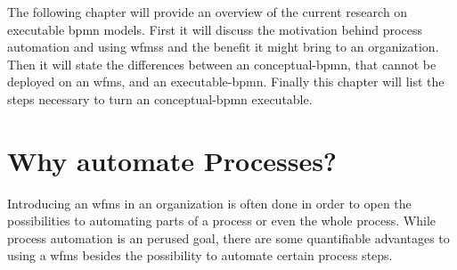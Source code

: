 
The following chapter will provide an overview of the current research on executable \gls{bpmn} models. First it will discuss the motivation behind process automation and using \gls{wfms}s and the benefit it might bring to an organization. Then it will state the differences between an \gls{conceptual-bpmn}, that cannot be deployed on an \gls{wfms}, and an \gls{executable-bpmn}. Finally this chapter will list the steps necessary to turn an \gls{conceptual-bpmn} executable.

\section{Why automate Processes?}
Introducing an \gls{wfms} in an organization is often done in order to open the possibilities to automating parts of a process or even the whole process. While process automation is an perused goal, there are some quantifiable advantages to using a \gls{wfms} besides the possibility to automate certain process steps.
